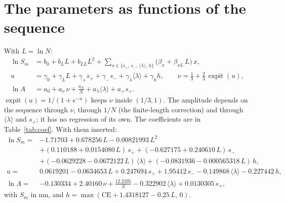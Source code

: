 \documentclass[11pt]{article}
\newcommand{\lam}{\langle\lambda\rangle}
\newcommand{\expit}{\operatorname{expit}}
\begin{document}
\section{The parameters as functions of the sequence}
With $L=\ln N$:
\begin{align}
\ln S_m &= b_0+b_L L+b_{LL}L^2+\sum_{x\in\{s_+,\,s_-,\,\lam,\,h\}}\big(\beta_x+\beta_{xL}\,L\big)\,x, \label{eq:Sm}\\
u &= \gamma_0+\gamma_L L+\gamma_+ s_+ +\gamma_- s_- +\gamma_\lambda\lam+\gamma_h h,\qquad \nu=\frac13+\frac23\,\expit(u),\label{eq:nu}\\
\ln A &= a_0+a_\nu\,\nu+\frac{a_N}{N}+a_\lambda\lam+a_+ s_+ .\label{eq:A}
\end{align}
$\expit(u)=1/(1+e^{-u})$ keeps $\nu$ inside $(1/3,1)$. The amplitude depends on the sequence through $\nu$, through
$1/N$ (the finite-length correction) and through $\lam$ and $s_+$; it has no regression of its own. The coefficients
are in Table~\ref{tab:coef}. With them inserted:
\begin{align*}
\ln S_m ={}& -1.71703+0.678256\,L-0.00821993\,L^2\\
 &+(0.110188+0.0154080\,L)\,s_+ +(-0.627175+0.240610\,L)\,s_-\\
 &+(-0.0629228-0.0672122\,L)\,\lam+(-0.0831936-0.000565318\,L)\,h,\\[2pt]
u ={}& 0.0619201-0.0634653\,L+0.247694\,s_+ +1.95412\,s_- -0.149868\,\lam-0.227442\,h,\\[2pt]
\ln A ={}& -0.130334+2.40160\,\nu+\frac{12.2395}{N}-0.322902\,\lam+0.0130305\,s_+ ,
\end{align*}
with $S_m$ in nm, and $h=\max(\mathrm{CE}+1.4318127-0.25\,L,\,0)$.
\end{document}
